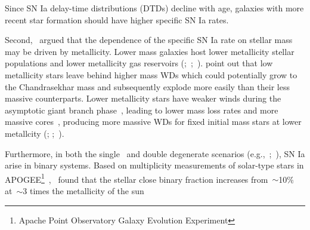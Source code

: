 \documentclass[ms.tex]{subfiles}
\begin{document}
Since SN Ia delay-time distributions (DTDs) decline with age, galaxies with
more recent star formation should have higher specific SN Ia rates.
\par
Second,~\citet{Kistler2013} argued that the dependence of the specific SN Ia
rate on stellar mass may be driven by metallicity.
Lower mass galaxies host lower metallicity stellar populations
\citep{Gallazzi2005, Kirby2013} and lower metallicity gas reservoirs
(\citealp{Tremonti2004};~\citealp*{Zahid2011};~\citealp{Andrews2013,
Zahid2014}).
\citet{Kistler2013} point out that low metallicity stars leave behind higher
mass WDs which could potentially grow to the Chandrasekhar mass and
subsequently explode more easily than their less massive counterparts.
Lower metallicity stars have weaker winds during the asymptotic giant branch
phase~\citep{Willson2000, Marigo2007}, leading to lower mass loss rates and
more massive cores~\citep{Kalirai2014}, producing more massive WDs for fixed
initial mass stars at lower metallcity (\citealp{Umeda1999};
\citealp*{Meng2008};~\citealp{Zhao2012}).
\par
Furthermore, in both the single~\citep[e.g.,][]{Whelan1973} and double
degenerate scenarios (e.g.,~\citealp{Iben1984};~\mbox{\citealp{Webbink1984}}),
SN Ia arise in binary systems.
Based on multiplicity measurements of solar-type stars in APOGEE\footnote{
	Apache Point Observatory Galaxy Evolution Experiment
}~\citep{Majewski2017},~\citet*{Moe2019} found that the stellar close binary
fraction increases from~$\sim$10\% at~$\sim$3 times the metallicity of the sun
\end{document}
